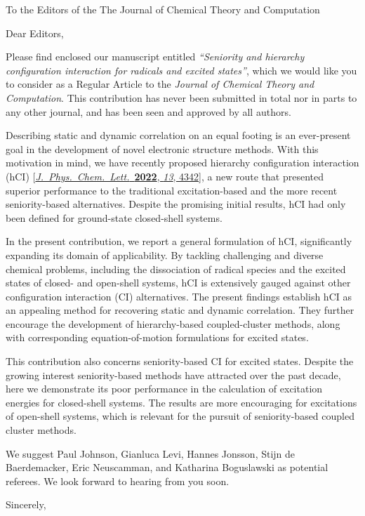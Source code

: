 \documentclass[10pt]{letter}
\begin{document}
\begin{letter}%
{To the Editors of the The Journal of Chemical Theory and Computation}

\opening{Dear Editors,}

\justifying
Please find enclosed our manuscript entitled \textit{``Seniority and hierarchy configuration interaction for radicals and excited states''}, 
which we would like you to consider as a Regular Article to the \textit{Journal of Chemical Theory and Computation}.
This contribution has never been submitted in total nor in parts to any other journal, and has been seen and approved by all authors.

Describing static and dynamic correlation on an equal footing is an ever-present goal in the development of novel electronic structure methods.
With this motivation in mind, we have recently proposed hierarchy configuration interaction (hCI)
[\href{https://doi.org/10.1021/acs.jpclett.2c00730}{\textit{J.~Phys.~Chem.~Lett.}~\textbf{2022}, \textit{13}, 4342}],
a new route that presented superior performance to the traditional excitation-based and the more recent seniority-based alternatives.
Despite the promising initial results, hCI had only been defined for ground-state closed-shell systems.

In the present contribution, we report a general formulation of hCI, significantly expanding its domain of applicability.
By tackling challenging and diverse chemical problems, including the dissociation of radical species and the excited states of closed- and open-shell systems,
hCI is extensively gauged against other configuration interaction (CI) alternatives.
The present findings establish hCI as an appealing method for recovering static and dynamic correlation.
They further encourage the development of hierarchy-based coupled-cluster methods, along with corresponding equation-of-motion formulations for excited states.

This contribution also concerns seniority-based CI for excited states.
Despite the growing interest seniority-based methods have attracted over the past decade,
here we demonstrate its poor performance in the calculation of excitation energies for closed-shell systems.
The results are more encouraging for excitations of open-shell systems,
which is relevant for the pursuit of seniority-based coupled cluster methods.

We suggest Paul Johnson, Gianluca Levi, Hannes Jonsson, Stijn de Baerdemacker, Eric Neuscamman, and Katharina Boguslawski as potential referees.
We look forward to hearing from you soon.

\closing{Sincerely,}

\end{letter}
\end{document}
